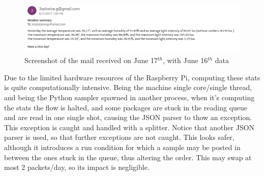 \documentclass[11pt]{article}
\begin{document}
\begin{figure}[h]
\includegraphics[width=\textwidth]{summary}
\caption{Screenshot of the mail received on June 17$^{th}$, with June 16$^{th}$ data}
\label{fig:june16}
\end{figure}

Due to the limited hardware resources of the Raspberry Pi, computing these stats is quite computationally intensive. Being the machine single core/single thread, and being the Python sampler spawned in another process, when it's computing the stats the flow is halted, and some packages are stuck in the reading queue and are read in one single shot, causing the JSON parser to thow an exception. This exception is caught and handled with a splitter. Notice that another JSON parser is used, so that further exceptions are not caught. This looks safer, although it introduces a run condition for which a sample may be posted in between the ones stuck in the queue, thus altering the order. This may swap at most 2 packets/day, so its impact is negligible.
\end{document}
